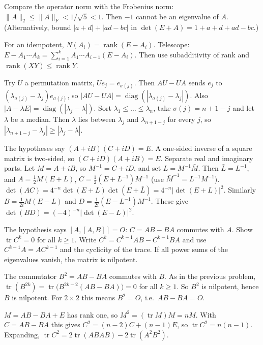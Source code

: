 \documentclass[11pt,a4paper]{article}
\begin{document}
Compare the operator norm with the Frobenius norm: \(\|A\|_2\le\|A\|_F<1/\sqrt5<1\). Then \(-1\) cannot be an eigenvalue of \(A\). (Alternatively, bound \(|a+d|+|ad-bc|\) in \(\det(E+A)=1+a+d+ad-bc\).)

For an idempotent, \(N(A_i)=\operatorname{rank}(E-A_i)\).
Telescope: \(E-A_1\cdots A_k=\sum_{i=1}^kA_1\cdots A_{i-1}(E-A_i)\). Then use subadditivity of rank and \(\operatorname{rank}(XY)\le\operatorname{rank}Y\).

Try \(U\) a permutation matrix, \(Ue_j=e_{\sigma(j)}\). Then \(AU-UA\) sends \(e_j\) to \((\lambda_{\sigma(j)}-\lambda_j)e_{\sigma(j)}\), so \(|AU-UA|=\operatorname{diag}(|\lambda_{\sigma(j)}-\lambda_j|)\). Also \(|A-\lambda E|=\operatorname{diag}(|\lambda_j-\lambda|)\).
Sort \(\lambda_1\le\dots\le\lambda_n\), take \(\sigma(j)=n+1-j\) and let \(\lambda\) be a median. Then \(\lambda\) lies between \(\lambda_j\) and \(\lambda_{n+1-j}\) for every \(j\), so \(|\lambda_{n+1-j}-\lambda_j|\ge|\lambda_j-\lambda|\).

The hypotheses say \((A+iB)(C+iD)=E\). A one-sided inverse of a square matrix is two-sided, so \((C+iD)(A+iB)=E\). Separate real and imaginary parts.
Let \(M=A+iB\), so \(M^{-1}=C+iD\), and set \(L=M^{-1}\bar M\). Then \(\bar L=L^{-1}\), and \(A=\frac12M(E+L)\), \(C=\frac12(E+L^{-1})M^{-1}\) (use \(\bar M^{-1}=L^{-1}M^{-1}\)).
\(\det(AC)=4^{-n}\det(E+L)\det(E+\bar L)=4^{-n}|\det(E+L)|^2\). Similarly \(B=\frac1{2i}M(E-L)\) and \(D=\frac1{2i}(E-L^{-1})M^{-1}\). These give \(\det(BD)=(-4)^{-n}|\det(E-L)|^2\).

The hypothesis says \([A,[A,B]]=O\): \(C=AB-BA\) commutes with \(A\).
Show \(\operatorname{tr}C^k=0\) for all \(k\ge1\). Write \(C^k=C^{k-1}AB-C^{k-1}BA\) and use \(C^{k-1}A=AC^{k-1}\) and the cyclicity of the trace. If all power sums of the eigenvalues vanish, the matrix is nilpotent.

The commutator \(B^2=AB-BA\) commutes with \(B\). As in the previous problem, \(\operatorname{tr}(B^{2k})=\operatorname{tr}\bigl(B^{2k-2}(AB-BA)\bigr)=0\) for all \(k\ge1\).
So \(B^2\) is nilpotent, hence \(B\) is nilpotent. For \(2\times2\) this means \(B^2=O\), i.e.\ \(AB-BA=O\).

\(M=AB-BA+E\) has rank one, so \(M^2=(\operatorname{tr}M)M=nM\).
With \(C=AB-BA\) this gives \(C^2=(n-2)C+(n-1)E\), so \(\operatorname{tr}C^2=n(n-1)\). Expanding, \(\operatorname{tr}C^2=2\operatorname{tr}(ABAB)-2\operatorname{tr}(A^2B^2)\).
\end{document}
